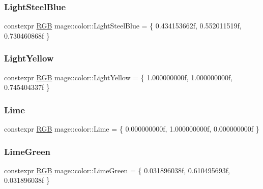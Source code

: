 \subsubsection{\texorpdfstring{Light\+Steel\+Blue}{LightSteelBlue}}
{\footnotesize\ttfamily constexpr \hyperlink{structmage_1_1_r_g_b}{R\+GB} mage\+::color\+::\+Light\+Steel\+Blue = \{ 0.\+434153662f, 0.\+552011519f, 0.\+730460868f \}}

\hypertarget{namespacemage_1_1color_a46b3fdd57b6933a6bafb704682e82518}{}\label{namespacemage_1_1color_a46b3fdd57b6933a6bafb704682e82518} 
\subsubsection{\texorpdfstring{Light\+Yellow}{LightYellow}}
{\footnotesize\ttfamily constexpr \hyperlink{structmage_1_1_r_g_b}{R\+GB} mage\+::color\+::\+Light\+Yellow = \{ 1.\+000000000f, 1.\+000000000f, 0.\+745404337f \}}

\hypertarget{namespacemage_1_1color_ad30a72922fc74a93b1d86e6da0fe3edb}{}\label{namespacemage_1_1color_ad30a72922fc74a93b1d86e6da0fe3edb} 
\subsubsection{\texorpdfstring{Lime}{Lime}}
{\footnotesize\ttfamily constexpr \hyperlink{structmage_1_1_r_g_b}{R\+GB} mage\+::color\+::\+Lime = \{ 0.\+000000000f, 1.\+000000000f, 0.\+000000000f \}}

\hypertarget{namespacemage_1_1color_a164223d6970354e460665eaf3d163d47}{}\label{namespacemage_1_1color_a164223d6970354e460665eaf3d163d47} 
\subsubsection{\texorpdfstring{Lime\+Green}{LimeGreen}}
{\footnotesize\ttfamily constexpr \hyperlink{structmage_1_1_r_g_b}{R\+GB} mage\+::color\+::\+Lime\+Green = \{ 0.\+031896038f, 0.\+610495693f, 0.\+031896038f \}}

\hypertarget{namespacemage_1_1color_add4a34c183b39c88f3e4ff8d627f5637}{}\label{namespacemage_1_1color_add4a34c183b39c88f3e4ff8d627f5637} 
